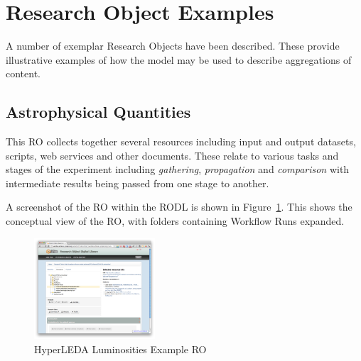 \newcommand{\picwidth}{0.4\textwidth}

\section{Research Object Examples}
\label{sec:examples}

A number of exemplar Research Objects have been described. These
provide illustrative examples of how the model may be used to describe
aggregations of content. 

\subsection{Astrophysical Quantities}

This RO collects together several resources including input and output
datasets, scripts, web services and other documents. These relate to
various tasks and stages of the experiment including
\emph{gathering}, \emph{propagation} and \emph{comparison} with
intermediate results being passed from one stage to another. 

A screenshot of the RO within the RODL is shown in
Figure~\ref{fig:hyperleda}. This shows the conceptual view of the RO,
with folders containing Workflow Runs expanded.

\begin{figure}[ht]
  \centering
  \includegraphics[width=\picwidth]{Figures/HyperLEDA}
  \caption{HyperLEDA Luminosities Example RO}
  \label{fig:hyperleda}
\end{figure}


